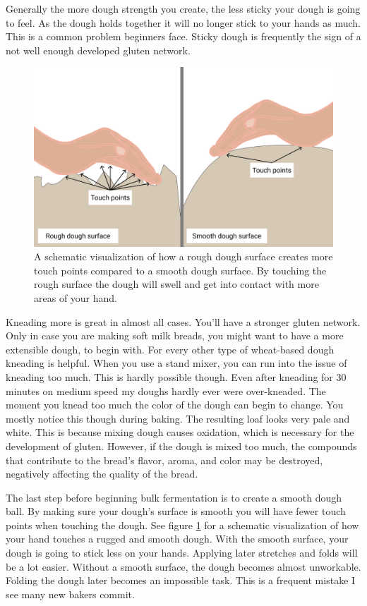 Generally the more dough strength you create, the less sticky your dough is going to
feel. As the dough holds together it will no longer stick to your hands as
much. This is a common problem beginners face. Sticky dough is frequently
the sign of a not well enough developed gluten network.

\begin{figure}[!htb]
  \includegraphics[width=\textwidth]{dough-surface-touchpoints}
  \caption{A schematic visualization of how a rough dough surface
  creates more touch points compared to a smooth dough surface.
  By touching the rough surface the dough will swell and get into
  contact with more areas of your hand.
  }
  \label{fig:dough-touch-points}
\end{figure}

Kneading more is great in almost all cases. You'll have a stronger
gluten network. Only in case you are making soft milk breads, you
might want to have a more extensible dough, to begin with. For every
other type of wheat-based dough kneading is helpful. When you use
a stand mixer, you can run into the issue of kneading too much. This
is hardly possible though. Even after kneading for 30 minutes on medium
speed my doughs hardly ever were over-kneaded. The moment you knead
too much the color of the dough can begin to change. You mostly
notice this though during baking. The resulting loaf looks very
pale and white. This is because mixing dough causes oxidation,
which is necessary for the development of gluten.
However, if the dough is mixed too much, the compounds that contribute
to the bread's flavor, aroma, and color may be destroyed, negatively
affecting the quality of the bread.\cite{oxidization+dough}

The last step before beginning bulk fermentation is to
create a smooth dough ball. By making sure your dough's surface is
smooth you will have fewer touch points when touching the dough.
See figure \ref{fig:dough-touch-points} for a schematic visualization
of how your hand touches a rugged and smooth dough.
With the smooth surface, your dough is going to stick less on your hands. Applying
later stretches and folds will be a lot easier. Without a smooth
surface, the dough becomes almost unworkable. Folding the dough later
becomes an impossible task. This is a frequent mistake I see many
new bakers commit.

